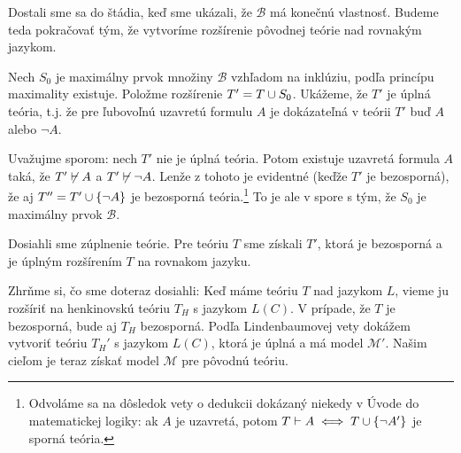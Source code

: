 \begin{dokaz}
    Dostali sme sa do štádia, keď sme ukázali, že $\mathcal{B}$ má
    konečnú vlastnosť. Budeme teda pokračovať tým, že vytvoríme
    rozšírenie pôvodnej teórie nad rovnakým jazykom.

    Nech $S_0$ je maximálny prvok množiny $\mathcal{B}$ vzhľadom na
    inklúziu, podľa princípu maximality existuje.
    Položme rozšírenie $T' = T \cup S_0$. Ukážeme, že $T'$ je úplná
    teória, t.j. že pre ľubovoľnú uzavretú formulu $A$ je dokázateľná
    v teórii $T'$ buď $A$ alebo $\neg A$.

    Uvažujme sporom: nech $T'$ nie je úplná teória. 
    Potom existuje uzavretá formula $A$ taká,
    že $T'\not \vdash A$ a $T' \not \vdash \neg A$.
    Lenže z tohoto je evidentné (keďže $T'$ je bezosporná), že aj
    $T'' = T' \cup \{\neg A\}$ je bezosporná teória.\footnote{
        Odvoláme sa na dôsledok vety o dedukcii dokázaný niekedy v
        Úvode do matematickej logiky: ak $A$ je uzavretá,
        potom $T \vdash A \iff T \cup \{\neg A'\}$ je sporná teória.
    }
    To je ale v spore s tým, že $S_0$ je maximálny prvok $\mathcal{B}$.

    Dosiahli sme zúplnenie teórie. Pre teóriu $T$ sme získali $T'$,
    ktorá je bezosporná a je úplným rozšírením $T$ na rovnakom jazyku.
    \\
\end{dokaz}

Zhrňme si, čo sme doteraz dosiahli:
Keď máme teóriu $T$ nad jazykom $L$,
vieme ju rozšíriť na henkinovskú teóriu $T_H$ s jazykom $L(C)$.
V prípade, že $T$ je bezosporná, bude aj $T_H$ bezosporná.
Podľa Lindenbaumovej vety dokážem vytvoriť teóriu $T_H'$ s jazykom
$L(C)$, ktorá je úplná a má model $\mathcal{M}'$.
Našim cieľom je teraz získať model $\mathcal{M}$ pre pôvodnú teóriu.


